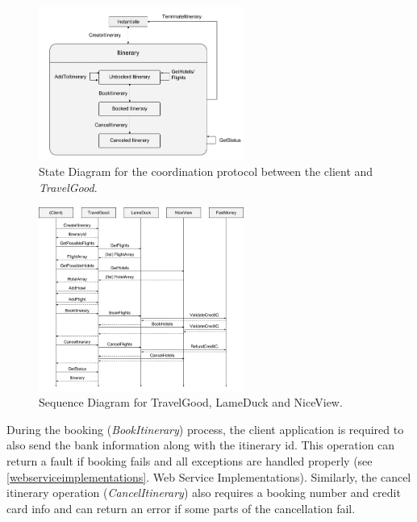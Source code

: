 \begin{figure}[H]
\centering
\includegraphics[width=0.6\textwidth]{images/StateDiagram}
\caption{State Diagram for the coordination protocol between the client and \textit{TravelGood}.}
\label{statediagram}
\end{figure}

\begin{figure}[H]
\centering
\includegraphics[width=0.6\textwidth]{images/SequenceDiagram}
\caption{Sequence Diagram for TravelGood, LameDuck and NiceView.}
\label{sequencediagram}
\end{figure}

During the booking (\textit{BookItinerary}) process, the client application is required to also send the bank information along with the itinerary id. This operation can return a fault if booking fails and all exceptions are handled properly (see \ref{webserviceimplementations}. Web Service Implementations). 
Similarly, the cancel itinerary operation (\textit{CancelItinerary}) also requires a booking number and credit card info and can return an error if some parts of the cancellation fail.
